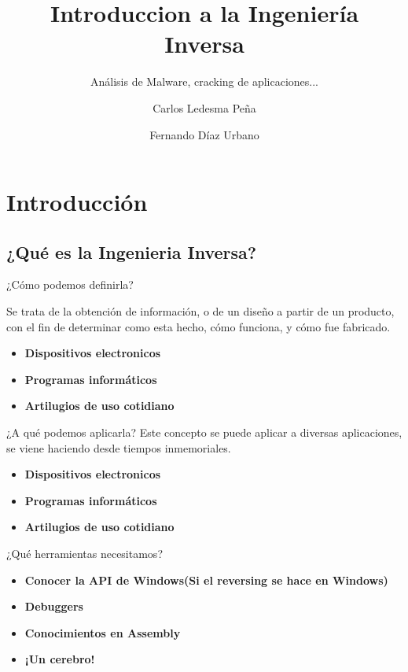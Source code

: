 \documentclass{beamer}
\title{Introduccion a la Ingeniería Inversa}
\subtitle{Análisis de Malware, cracking de aplicaciones...}
\author{Carlos Ledesma Peña
\and
Fernando Díaz Urbano}
\institute{Grupo de Desarrollo de Google, Málaga}
\date{}
\begin{document}
\begin{frame}
\titlepage
\end{frame}

\section{Introducción}

\subsection{¿Qué es la Ingenieria Inversa?}

\begin{frame}{¿Cómo podemos definirla?}

Se trata de la obtención de información, o de un diseño a partir de un producto, con el fin de determinar como esta hecho, cómo funciona, y cómo fue fabricado.
\begin{itemize}
	\item \textbf{Dispositivos electronicos} 
	\item \textbf{Programas informáticos}
	\item \textbf{Artilugios de uso cotidiano}
\end{itemize}

\end{frame}

\begin{frame}{¿A qué podemos aplicarla?}
Este concepto se puede aplicar a diversas aplicaciones, se viene haciendo desde tiempos inmemoriales.
\begin{itemize}
	\item \textbf{Dispositivos electronicos} 
	\item \textbf{Programas informáticos}
	\item \textbf{Artilugios de uso cotidiano}
\end{itemize}
\end{frame}

\begin{frame}{¿Qué herramientas necesitamos?}
\begin{itemize}
\item \textbf{Conocer la API de Windows(Si el reversing se hace en Windows)}
\item \textbf{Debuggers}
\item \textbf{Conocimientos en Assembly}
\item \textbf{¡Un cerebro!}
\end{itemize}

\end{frame}
\end{document}
